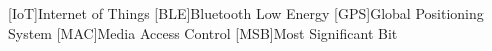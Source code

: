 \begin{acronym}[AAAAA]

    [IoT]{Internet of Things}
    [BLE]{Bluetooth Low Energy}
    [GPS]{Global Positioning System}
    [MAC]{Media Access Control}
    [MSB]{Most Significant Bit}
    
\end{acronym}